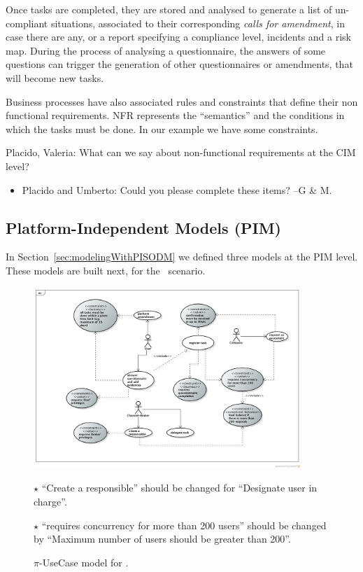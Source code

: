 Once tasks are completed, they are stored and analysed to generate a list of un-compliant situations, associated to their corresponding \textit{calls for amendment}, in case there are any, or a report specifying a compliance level, incidents and a risk map.
During the process of analysing a questionnaire, the answers of some questions can trigger the generation of other questionnaires or amendments, that will become new tasks.  

Business processes have also associated rules and constraints that define their non functional requirements.
NFR represents the ``semantics'' and the conditions in which the tasks must be done.
In our example we have some constraints.

{\color{red}
Placido, Valeria: What can we say about non-functional requirements at the CIM level?
}



\begin{itemize}
\item {\color{magenta} Placido and Umberto: Could you please complete these items? --G \& M.}
\end{itemize}




\subsection{Platform-Independent Models (PIM)}

In Section~\ref{sec:modelingWithPISODM} we defined three models at the PIM level.
These models are built next, for the \FlyingPig\ scenario.

\begin{figure}[t]
\centering
\includegraphics[width=0.9\textwidth]{figs/UseCaseGeneral.png}

{\color{red} \raggedright
$\star$ ``Create a responsible'' should be changed for ``Designate user in charge''.

$\star$ ``requires concurrency for more than 200 users'' should be changed by ``Maximum number of users should be greater than 200''.
}
\caption{$\pi$-UseCase model for \FlyingPig.\label{fig:piUseCaseModel}}
\end{figure}


